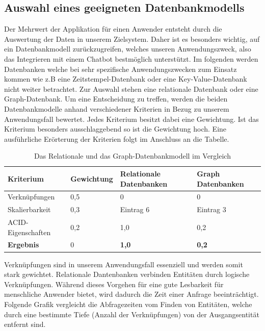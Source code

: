 \subsection{Auswahl eines geeigneten Datenbankmodells}
Der Mehrwert der Applikation für einen Anwender entsteht durch die Auswertung der Daten in unserem Zielsystem. Daher ist es besonders wichtig, auf ein Datenbankmodell zurückzugreifen, welches unseren Anwendungszweck, also das Integrieren mit einem Chatbot bestmöglich unterstützt. Im folgenden werden Datenbanken welche bei sehr spezifische Anwendungszwecken zum Einsatz kommen wie z.B eine Zeitstempel-Datenbank oder eine Key-Value-Datenbank nicht weiter betrachtet. Zur Auswahl stehen eine relationale Datenbank oder eine Graph-Datenbank. Um eine Entscheidung zu treffen, werden die beiden Datenbankmodelle anhand verschiedener Kriterien in Bezug zu unserem Anwendungsfall bewertet. Jedes Kriterium besitzt dabei eine Gewichtung. Ist das Kriterium besonders ausschlaggebend so ist die Gewichtung hoch. Eine ausführliche Erörterung der Kriterien folgt im Anschluss an die Tabelle.
\begin{table}[H]
\caption{Das Relationale und das Graph-Datenbankmodell im Vergleich}
    \begin{tabularx}{\textwidth}{|X|X|X|X|}
    \hline
    \textbf{Kriterium} & \textbf{Gewichtung} & \textbf{Relationale Datenbanken} & \textbf{Graph Datenbanken} \\ \hline
    Verknüpfungen         & 0,5         & 0 &  0 \\ \hline
    Skalierbarkeit         & 0,3         & Eintrag 6   & Eintrag 3        \\ \hline
    ACID-Eigenschaften         & 0,2         & 1,0    & 0,2      \\ \hline
    \textbf{Ergebnis}         &    0     & \textbf{1,0}    & \textbf{0,2}      \\ \hline
    \end{tabularx}
\end{table}
Verknüpfungen sind in unserem Anwendungsfall essenziell und werden somit stark gewichtet. Relationale Dantenbanken verbinden Entitäten durch logische Verknüpfungen. Während dieses Vorgehen für eine gute Lesbarkeit für menschliche Anwender bietet, wird dadurch die Zeit einer Anfrage beeinträchtigt. Folgende Grafik vergleicht die Abfragezeiten vom Finden von Entitäten, welche durch eine bestimmte Tiefe (Anzahl der Verknüpfungen) von der Ausgangsentität entfernt sind.

